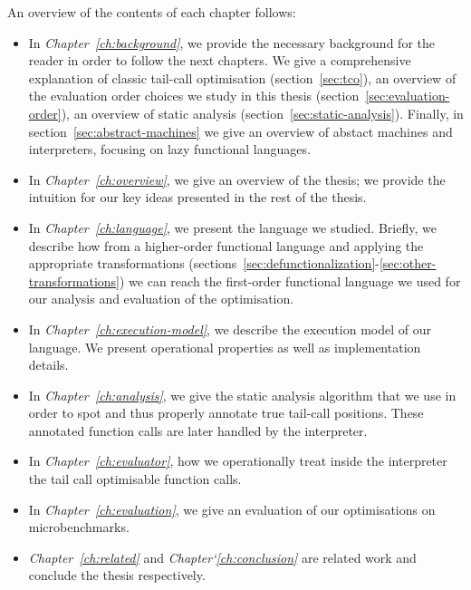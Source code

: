 \documentclass[diploma]{softlab-thesis}
\begin{document}
An overview of the contents of each chapter follows:
\begin{itemize}
  \item In \textit{Chapter~\ref{ch:background}}, we provide the necessary background for the reader in 
        order to follow the next chapters. We give a comprehensive explanation of classic 
        tail-call optimisation (section~\ref{sec:tco}), an overview of the evaluation order choices we study 
        in this thesis (section~\ref{sec:evaluation-order}), an overview of static analysis (section~\ref{sec:static-analysis}). Finally, 
        in section~\ref{sec:abstract-machines} we give an overview of abstact machines and interpreters, focusing on 
        lazy functional languages.

  \item In \textit{Chapter~\ref{ch:overview}}, we give an overview of the thesis; we provide the intuition 
        for our key ideas presented in the rest of the thesis.

  \item In \textit{Chapter~\ref{ch:language}}, we present the language we studied. Briefly, we describe 
        how from a higher-order functional language and applying the appropriate 
        transformations (sections~\ref{sec:defunctionalization}-\ref{sec:other-transformations}) we can reach the first-order functional 
        language we used for our analysis and evaluation of the optimisation.

  \item In \textit{Chapter~\ref{ch:execution-model}}, we describe the execution model of our language. We present operational 
        properties as well as implementation details.

  \item In \textit{Chapter~\ref{ch:analysis}}, we give the static analysis algorithm that we use in order to spot 
        and thus properly annotate true tail-call positions. These annotated function calls 
        are later handled by the interpreter.

  \item In \textit{Chapter~\ref{ch:evaluator}}, how we operationally treat inside the interpreter the 
        tail call optimisable function calls.

  \item In \textit{Chapter~\ref{ch:evaluation}}, we give an evaluation of our optimisations on microbenchmarks.

  \item \textit{Chapter~\ref{ch:related}} and \textit{Chapter`\ref{ch:conclusion}} are related work and conclude the thesis respectively.

\end{itemize}
\end{document}
